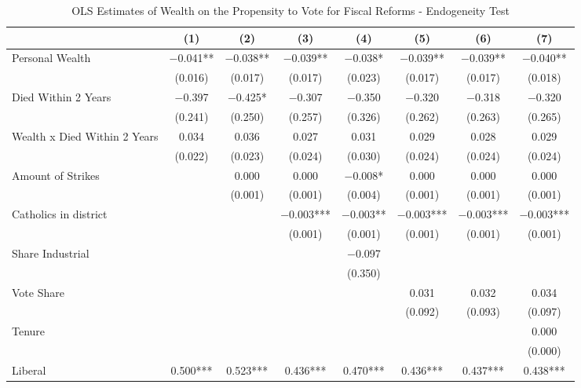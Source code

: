 \begin{table}

\caption{\label{tab:harnas}OLS Estimates of Wealth on the Propensity to Vote for Fiscal Reforms - Endogeneity Test}
\centering
\begin{tabular}[t]{lccccccc}
\toprule
  & (1) & (2) & (3) & (4) & (5) & (6) & (7)\\
\midrule
Personal Wealth & \num{-0.041}** & \num{-0.038}** & \num{-0.039}** & \num{-0.038}* & \num{-0.039}** & \num{-0.039}** & \num{-0.040}**\\
 & (\num{0.016}) & (\num{0.017}) & (\num{0.017}) & (\num{0.023}) & (\num{0.017}) & (\num{0.017}) & (\num{0.018})\\
Died Within 2 Years & \num{-0.397} & \num{-0.425}* & \num{-0.307} & \num{-0.350} & \num{-0.320} & \num{-0.318} & \num{-0.320}\\
 & (\num{0.241}) & (\num{0.250}) & (\num{0.257}) & (\num{0.326}) & (\num{0.262}) & (\num{0.263}) & (\num{0.265})\\
Wealth x Died Within 2 Years & \num{0.034} & \num{0.036} & \num{0.027} & \num{0.031} & \num{0.029} & \num{0.028} & \num{0.029}\\
 & (\num{0.022}) & (\num{0.023}) & (\num{0.024}) & (\num{0.030}) & (\num{0.024}) & (\num{0.024}) & (\num{0.024})\\
Amount of Strikes &  & \num{0.000} & \num{0.000} & \num{-0.008}* & \num{0.000} & \num{0.000} & \num{0.000}\\
 &  & (\num{0.001}) & (\num{0.001}) & (\num{0.004}) & (\num{0.001}) & (\num{0.001}) & (\num{0.001})\\
Catholics in district &  &  & \num{-0.003}*** & \num{-0.003}** & \num{-0.003}*** & \num{-0.003}*** & \num{-0.003}***\\
 &  &  & (\num{0.001}) & (\num{0.001}) & (\num{0.001}) & (\num{0.001}) & (\num{0.001})\\
Share Industrial &  &  &  & \num{-0.097} &  &  & \\
 &  &  &  & (\num{0.350}) &  &  & \\
Vote Share &  &  &  &  & \num{0.031} & \num{0.032} & \num{0.034}\\
 &  &  &  &  & (\num{0.092}) & (\num{0.093}) & (\num{0.097})\\
Tenure &  &  &  &  &  &  & \num{0.000}\\
 &  &  &  &  &  &  & (\num{0.000})\\
Liberal & \num{0.500}*** & \num{0.523}*** & \num{0.436}*** & \num{0.470}*** & \num{0.436}*** & \num{0.437}*** & \num{0.438}***\\

\end{tabular}
\end{table}
